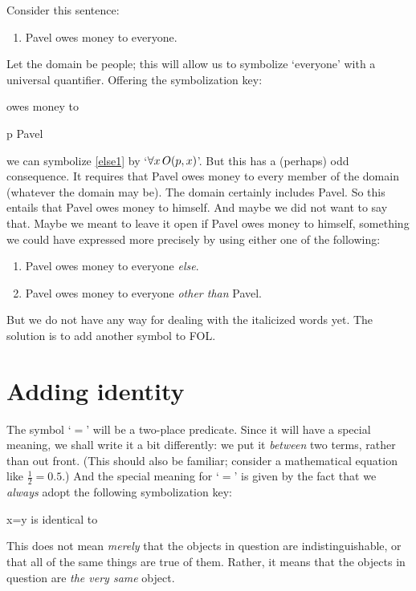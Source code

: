 Consider this sentence:
\begin{enumerate}
\item\label{else1} Pavel owes money to everyone.
\end{enumerate}
Let the domain be people; this will allow us to symbolize `everyone' with a universal quantifier. Offering the symbolization key:
	\begin{ekey}
		\item[\atom{O}{x,y}]  owes money to 
		\item[p] Pavel
	\end{ekey}
we can symbolize \cref*{else1} by `$\forall x\, O(p,x)$'. But this has a (perhaps) odd consequence. It requires that Pavel owes money to every member of the domain (whatever the domain may be). The domain certainly includes Pavel. So this entails that Pavel owes money to himself. And maybe we did not want to say that. Maybe we meant to leave it open if Pavel owes money to himself, something we could have expressed more precisely by using either one of the following:
	\begin{enumerate}
		\item\label{else1b} Pavel owes money to everyone \emph{else}.
		\item\label{else1c} Pavel owes money to everyone \emph{other than} Pavel.
	\end{enumerate}
But we do not have any way for dealing with the italicized words yet. The solution is to add another symbol to FOL.

\section{Adding identity}

The symbol `$=$' will be a two-place predicate. Since it will have a special meaning, we shall write it a bit differently: we put it \emph{between} two terms, rather than out front. (This should also be familiar; consider a mathematical equation like $\frac{1}{2} = 0.5$.) And the special meaning for `$=$' is given by the fact that we \emph{always} adopt the following symbolization key: 
	\begin{ekey}
		\item[x=y]  is identical to \gap{y}
	\end{ekey}
This does not mean \emph{merely} that the objects in question are indistinguishable, or that all of the same things are true of them. Rather, it means that the objects in question are \emph{the very same} object.

